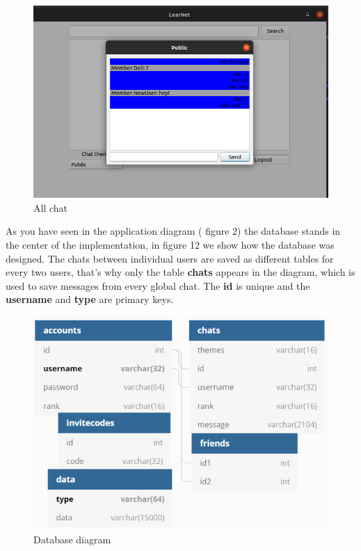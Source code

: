\documentclass[runningheads]{llncs}
\begin{document}
\begin{figure}[H]
\includegraphics[width=\textwidth,height=\textheight,keepaspectratio]{images/allchat.png}
\caption{All chat}
\end{figure}

\par As you have seen in the application diagram ( figure 2) the database stands in the center of the implementation, in figure 12 we show how the database was designed. The chats between individual users are saved as different tables for every two users, that's why only the table \textbf{chats} appears in the diagram, which is used to save messages from every global chat. The \textbf{id} is unique and the \textbf{username} and
\textbf{type} are primary keys.

\begin{figure}[H]
\includegraphics[width=\textwidth,height=\textheight,keepaspectratio]{images/dbdiagram.png}
\caption{Database diagram}
\end{figure}
\end{document}
